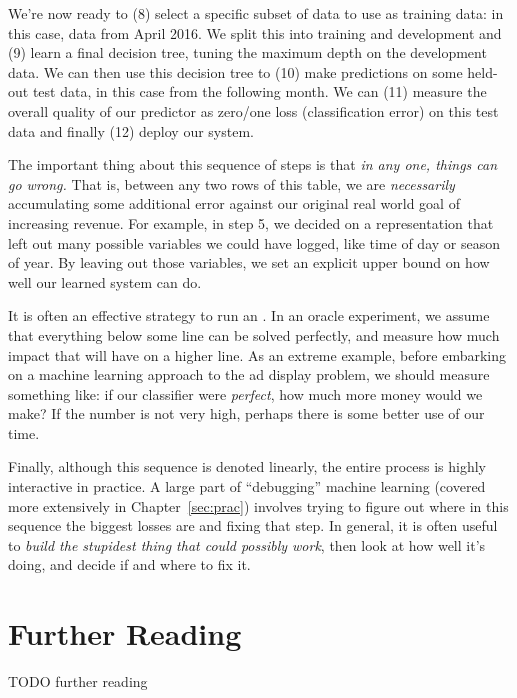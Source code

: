We're now ready to (8) select a specific subset of data to use as training data: in this case, data from April 2016. We split this into training and development and (9) learn a final decision tree, tuning the maximum depth on the development data. We can then use this decision tree to (10) make predictions on some held-out test data, in this case from the following month. We can (11) measure the overall quality of our predictor as zero/one loss (classification error) on this test data and finally (12) deploy our system.

The important thing about this sequence of steps is that \emph{in any one, things can go wrong.} That is, between any two rows of this table, we are \emph{necessarily} accumulating some additional error against our original real world goal of increasing revenue. For example, in step 5, we decided on a representation that left out many possible variables we could have logged, like time of day or season of year. By leaving out those variables, we set an explicit upper bound on how well our learned system can do.

It is often an effective strategy to run an . In an oracle experiment, we assume that everything below some line can be solved perfectly, and measure how much impact that will have on a higher line. As an extreme example, before embarking on a machine learning approach to the ad display problem, we should measure something like: if our classifier were \emph{perfect}, how much more money would we make? If the number is not very high, perhaps there is some better use of our time.

Finally, although this sequence is denoted linearly, the entire process is highly interactive in practice. A large part of ``debugging'' machine learning (covered more extensively in Chapter~\ref{sec:prac}) involves trying to figure out where in this sequence the biggest losses are and fixing that step. In general, it is often useful to \emph{build the stupidest thing that could possibly work}, then look at how well it's doing, and decide if and where to fix it.


\section{Further Reading}

TODO further reading


